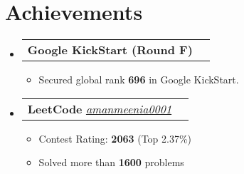 \documentclass[letterpaper,11pt]{article}
\makeatletter
\newcommand{\resumeItem}[1]{
  \item\small{
    {#1 \vspace{-2pt}}
  }
}
\newcommand{\resumeProjectHeading}[2]{
    \item
    \begin{tabular*}{1.001\textwidth}{l@{\extracolsep{\fill}}r}
      \small#1 & \textbf{\small #2}\\
    \end{tabular*}\vspace{-7pt}
}
\newcommand{\resumeSubHeadingListStart}{\begin{itemize}[leftmargin=0.0in, label={}]}
\newcommand{\resumeSubHeadingListEnd}{\end{itemize}}
\newcommand{\resumeItemListStart}{\begin{itemize}}
\newcommand{\resumeItemListEnd}{\end{itemize}\vspace{-5pt}}
\makeatother
\begin{document}
\section{Achievements}
    \vspace{-5pt}
    \resumeSubHeadingListStart
      \resumeProjectHeading
          {\textbf{Google KickStart (Round F)}}{}
          \resumeItemListStart
            \resumeItem{Secured global rank \textbf{696} in Google KickStart.}
          \resumeItemListEnd
          \vspace{-18pt}       \resumeProjectHeading
          {\textbf{LeetCode} 
    \href{https://leetcode.com/u/AmanMeenia0001/}{\textit{amanmeenia0001}}}{}
          \resumeItemListStart
            \resumeItem{Contest Rating: \textbf{2063} (Top 2.37\%)}
            \resumeItem{Solved more than \textbf{1600} problems}
          \resumeItemListEnd
          \vspace{-13pt} %
    \resumeSubHeadingListEnd
\vspace{-13pt} %
\end{document}
